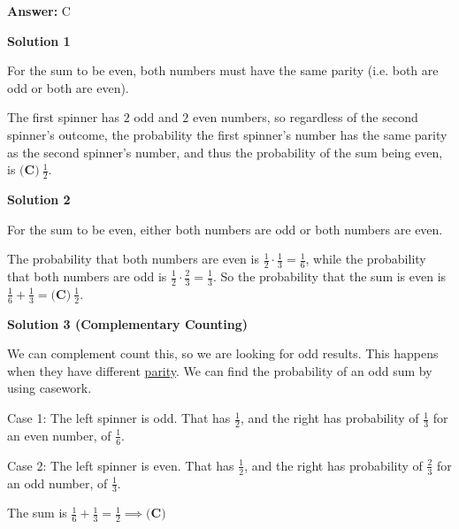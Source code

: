 \begin{enumerate}
 \textbf{Answer: }C



\textbf{Solution 1}

For the sum to be even, both numbers must have the same parity (i.e. both are odd or both are even).

 The first spinner has $2$ odd and $2$ even numbers, so regardless of the second spinner's outcome, the probability the first spinner's number has the same parity as the second spinner's number, and thus the probability of the sum being even, is  $\boxed{\textbf{(C)}\ \frac{1}{2}}$.

 



\textbf{Solution 2}

For the sum to be even, either both numbers are odd or both numbers are even.

 The probability that both numbers are even is $\frac{1}{2} \cdot \frac{1}{3} = \frac{1}{6}$, while the probability that both numbers are odd is $\frac{1}{2} \cdot \frac{2}{3} = \frac{1}{3}$.  So the probability that the sum is even is $\frac{1}{6} + \frac{1}{3} = \boxed{\textbf{(C)}\ \frac{1}{2}}$.

 



\textbf{Solution 3 (Complementary Counting)}

We can complement count this, so we are looking for odd results. This happens when they have different \href{https://artofproblemsolving.com/wiki/index.php?title=Parity}{parity}. We can find the probability of an odd sum by using casework. 

 Case 1: The left spinner is odd. That has $\frac{1}{2}$, and the right has probability of $\frac{1}{3}$ for an even number, of $\frac{1}{6}$. 

 Case 2: The left spinner is even. That has $\frac{1}{2}$, and the right has probability of $\frac{2}{3}$ for an odd number, of $\frac{1}{3}$.

 The sum is $\frac{1}{6}+\frac{1}{3} = \frac{1}{2} \implies \boxed{\textbf{(C)}}$



\end{enumerate}